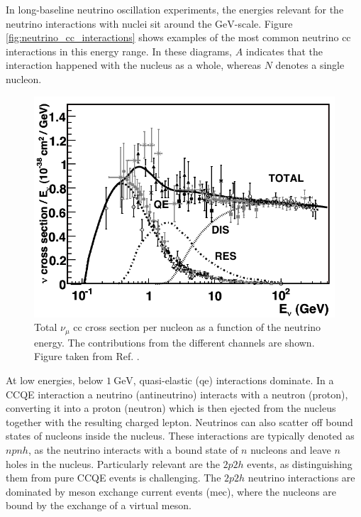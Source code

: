 In long-baseline neutrino oscillation experiments, the energies relevant for the neutrino interactions with nuclei sit around the $\mathrm{GeV}$-scale. Figure \ref{fig:neutrino_cc_interactions} shows examples of the most common neutrino \gls{cc} interactions in this energy range. In these diagrams, $A$ indicates that the interaction happened with the nucleus as a whole, whereas $N$ denotes a single nucleon.

\begin{figure}[t]
	\centering
	\includegraphics[width=.85\linewidth]{Images/Nu/numu_cc_cross_section.pdf}
	\caption[Total muon neutrino \gls{cc} cross section per nucleon as a function of the neutrino energy.]{Total $\nu_{\mu}$ \gls{cc} cross section per nucleon as a function of the neutrino energy. The contributions from the different channels are shown. Figure taken from Ref. \cite{Formaggio2012}.}
	\label{fig:numu_cc_cross_section}
\end{figure}

At low energies, below $1~\mathrm{GeV}$, quasi-elastic (\gls{qe}) interactions dominate. In a CCQE interaction a neutrino (antineutrino) interacts with a neutron (proton), converting it into a proton (neutron) which is then ejected from the nucleus together with the resulting charged lepton. Neutrinos can also scatter off bound states of nucleons inside the nucleus. These interactions are typically denoted as $npnh$, as the neutrino interacts with a bound state of $n$ nucleons and leave $n$ holes in the nucleus. Particularly relevant are the $2p2h$ events, as distinguishing them from pure CCQE events is challenging. The $2p2h$ neutrino interactions are dominated by meson exchange current events (\gls{mec}), where the nucleons are bound by the exchange of a virtual meson.

